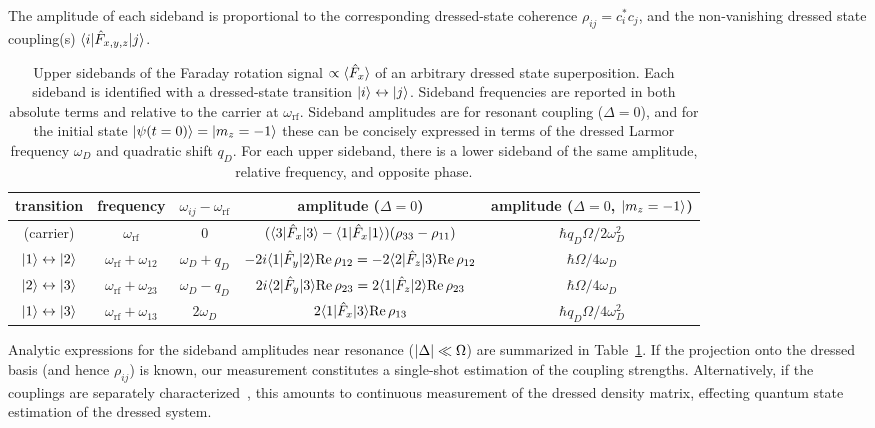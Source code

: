 \documentclass[aps,prl,reprint,superscriptaddress,floatfix]{revtex4-1}
\begin{document}
The amplitude of each sideband is proportional to the corresponding dressed-state coherence $\rho_{ij} = c_i^* c_j $, and the non-vanishing dressed state coupling(s) $\langle i \vert  \hat{F}_{x,y,z} \vert j \rangle $.
\begin{table*}[t]
    \caption{Upper sidebands of the Faraday rotation signal $\propto \langle \hat{F}_x \rangle$ of an arbitrary dressed state superposition.
    Each sideband is identified with a dressed-state transition $\vert i \rangle  \leftrightarrow \vert j \rangle $.
    Sideband frequencies are reported in both absolute terms and relative to the carrier at $\omega_{\text{rf}}$.
    Sideband amplitudes are for resonant coupling ($\Delta = 0$), and
    for the initial state $\vert \psi(t=0) \rangle =\vert m_z=-1 \rangle $ these can be concisely expressed in terms of the dressed Larmor frequency $\omega_D$ and quadratic shift $q_D$.
    For each upper sideband, there is a lower sideband of the same amplitude, relative frequency, and opposite phase.
    \label{tab:sidebands}
    }
    \begin{ruledtabular}
    \begin{tabular}{ccccc}
    transition & frequency & $\omega_{ij} - \omega_{\text{rf}}$ & amplitude ($\Delta = 0$) & amplitude ($\Delta = 0$, $\vert m_z=-1 \rangle $) \\ \hline
     (carrier) & $\omega_{\text{rf}}$ & 0 & $(\langle 3 \vert  \hat{F}_x \vert 3 \rangle  - \langle 1 \vert  \hat{F}_x \vert 1 \rangle ) (\rho_{33} - \rho_{11})$  & $\hbar q_D \Omega/2 \omega_D^2$ \\
     $\vert 1 \rangle  \leftrightarrow \vert 2 \rangle $ & $\omega_{\text{rf}} + \omega_{12}$ & $\omega_D+q_D$ & $-2i \langle 1 \vert  \hat{F}_y \vert 2 \rangle  \text{Re}\,\rho_{12} = -2 \langle 2 \vert  \hat{F}_z \vert 3 \rangle  \text{Re}\,\rho_{12}$ & $\hbar \Omega/4 \omega_D$ \\
     $\vert 2 \rangle  \leftrightarrow \vert 3 \rangle $ & $\omega_{\text{rf}} + \omega_{23}$ & $\omega_D-q_D$ & $2i \langle 2 \vert  \hat{F}_y \vert 3 \rangle  \text{Re}\,\rho_{23} = 2 \langle 1 \vert  \hat{F}_z \vert 2 \rangle  \text{Re}\,\rho_{23}$ & $\hbar \Omega/4 \omega_D$ \\
     $\vert 1 \rangle  \leftrightarrow \vert 3 \rangle $ & $\omega_{\text{rf}} + \omega_{13}$ & $2\omega_D$ & $2 \langle 1 \vert  \hat{F}_x \vert 3 \rangle  \text{Re}\,\rho_{13}$ & $\hbar q_D \Omega/4 \omega_D^2$
    \end{tabular}
    \end{ruledtabular}
\end{table*}
Analytic expressions for the sideband amplitudes near resonance ($\vert \Delta \vert  \ll \Omega$) are summarized in Table~\ref{tab:sidebands}.
If the projection onto the dressed basis (and hence $\rho_{ij}$) is known, our measurement constitutes a single-shot estimation of the coupling strengths.  
Alternatively, if the couplings are separately characterized~\cite{trypogeorgos_synthetic_2017}, this amounts to continuous measurement of the dressed density matrix, effecting quantum state estimation of the dressed system.
\end{document}
